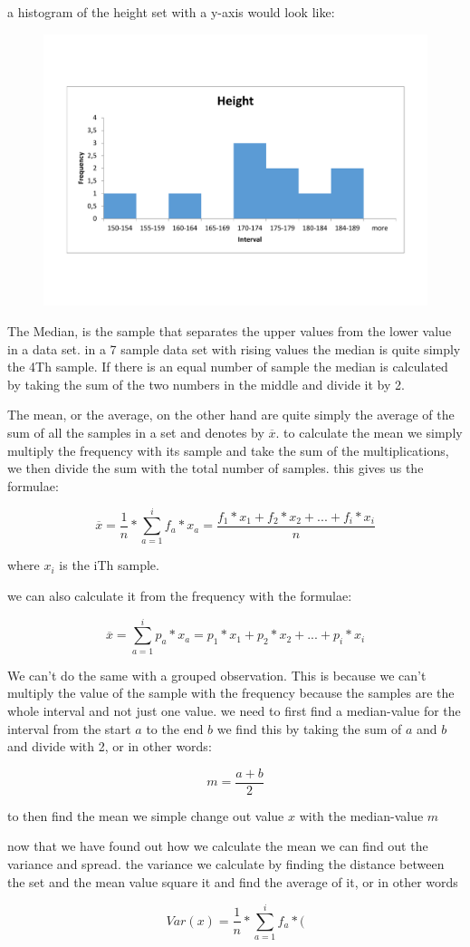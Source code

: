     a histogram of the height set with a y-axis would look like: 
    
    \begin{figure}[ht]
    \centering
    \includegraphics [width=12cm]{images/Height.pdf}
    \caption{}
    \label{fig:Height}
    \end{figure}
    
The Median, is the sample that separates the upper values from the lower value in a data set. in a 7 sample data set with rising values the median is quite simply the 4Th sample. If there is an equal number of sample the median is calculated by taking the sum of the two numbers in the middle and divide it by 2. 

The mean, or the average, on the other hand are quite simply the average of the sum of all the samples in a set and denotes by \(\overline{x}\). to calculate the mean we simply multiply the frequency with its sample and take the sum of the multiplications, we then divide the sum with the total number of samples. 
this gives us the formulae: 

\[ \overline{x} = \frac{1}{n} * \sum\limits_{a=1}^i f_a * x_a = \frac{f_1 * x_1 + f_2 * x_2 +...+ f_i * x_i}{n} \]    
    
where \(x_i\) is the iTh sample.

we can also calculate it from the frequency with the formulae: 

\[ \overline{x} = \sum\limits_{a=1}^i p_a * x_a = p_1 * x_1 + p_2 * x_2 +...+ p_i * x_i\]

We can't do the same with a grouped observation. This is because we can't multiply the value of the sample with the frequency because the samples are the whole interval and not just one value. 
we need to first find a median-value for the interval from the start \(a\) to the end \(b\) we find this by taking the sum of \(a\) and \(b\) and divide with 2, or in other words: 

\[ m = \frac{a+b}{2}\]

to then find the mean we simple change out value \(x\) with the median-value \(m\)

now that we have found out how we calculate the mean we can find out the variance and spread. the variance we calculate by finding the distance between the set and the mean value square it and find the average of it, or in other words

\[Var(x) = \frac{1}{n} * \sum\limits_{a=1}^i f_a *( \]


